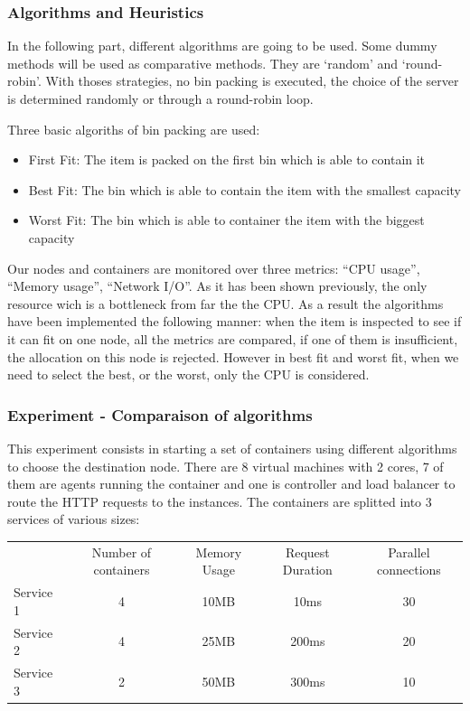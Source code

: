 \subsubsection{Algorithms and Heuristics}

In the following part, different algorithms are going to be used. Some dummy
methods will be used as comparative methods. They are `random' and
`round-robin'. With thoses strategies, no bin packing is executed, the choice
of the server is determined randomly or through a round-robin loop.

Three basic algoriths of bin packing are used:

\begin{itemize}
	\item{First Fit: The item is packed on the first bin which is able to contain it}
	\item{Best Fit: The bin which is able to contain the item with the smallest capacity}
	\item{Worst Fit: The bin which is able to container the item with the biggest capacity}
\end{itemize}

Our nodes and containers are monitored over three metrics: ``CPU usage'',
``Memory usage'', ``Network I/O''.  As it has been shown previously, the only
resource wich is a bottleneck from far the the CPU\@. As a result the
algorithms have been implemented the following manner: when the item is
inspected to see if it can fit on one node, all the metrics are compared, if
one of them is insufficient, the allocation on this node is rejected. However
in best fit and worst fit, when we need to select the best, or the worst, only
the CPU is considered.

\subsubsection{Experiment - Comparaison of algorithms}

This experiment consists in starting a set of containers using different
algorithms to choose the destination node. There are 8 virtual machines with 2
cores, 7 of them are agents running the container and one is controller and
load balancer to route the HTTP requests to the instances. The containers are
splitted into 3 services of various sizes:

\vspace{1em}
\begin{tabular}{l | c | c | c | c}
	& Number of containers & Memory Usage & Request Duration & Parallel connections \\
	Service 1 & 4 & 10MB & 10ms & 30 \\
	Service 2 & 4 & 25MB & 200ms & 20 \\
	Service 3 & 2 & 50MB & 300ms & 10 \\
\end{tabular}
\vspace{1em}

